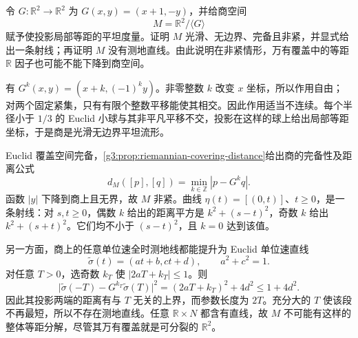 \begin{optionalexercise}\label{g3:ex:flat-mobius-no-line}
	令 \(G:\mathbb R^2\to\mathbb R^2\) 为 \(G(x,y)=(x+1,-y)\)，并给商空间
	\[
		M=\mathbb R^2/\langle G\rangle
	\]
	赋予使投影局部等距的平坦度量。证明 \(M\) 光滑、无边界、完备且非紧，并显式给出一条射线；再证明 \(M\) 没有测地直线。由此说明在非紧情形，万有覆盖中的等距 \(\mathbb R\) 因子也可能不能下降到商空间。
\end{optionalexercise}
\begin{solution}
	有 \(G^k(x,y)=(x+k,(-1)^ky)\)。非零整数 \(k\) 改变 \(x\) 坐标，所以作用自由；对两个固定紧集，只有有限个整数平移能使其相交。因此作用适当不连续。每个半径小于 \(1/3\) 的 Euclid 小球与其非平凡平移不交，投影在这样的球上给出局部等距坐标，于是商是光滑无边界平坦流形。

	Euclid 覆盖空间完备，\cref{g3:prop:riemannian-covering-distance}给出商的完备性及距离公式
	\[
		d_M([p],[q])=\min_{k\in\mathbb Z}|p-G^kq|.
	\]
	函数 \(|y|\) 下降到商上且无界，故 \(M\) 非紧。曲线 \(\eta(t)=[(0,t)]\)、\(t\ge0\)，是一条射线：对 \(s,t\ge0\)，偶数 \(k\) 给出的距离平方是 \(k^2+(s-t)^2\)，奇数 \(k\) 给出 \(k^2+(s+t)^2\)。它们均不小于 \((s-t)^2\)，且 \(k=0\) 达到该值。

	另一方面，商上的任意单位速全时测地线都能提升为 Euclid 单位速直线
	\[
		\widetilde\sigma(t)=(at+b,ct+d),\qquad a^2+c^2=1.
	\]
	对任意 \(T>0\)，选奇数 \(k_T\) 使 \(|2aT+k_T|\le1\)。则
	\[
		\bigl|\widetilde\sigma(-T)-G^{k_T}\widetilde\sigma(T)\bigr|^2
		=(2aT+k_T)^2+4d^2\le1+4d^2.
	\]
	因此其投影两端的距离有与 \(T\) 无关的上界，而参数长度为 \(2T\)。充分大的 \(T\) 使该段不再最短，所以不存在测地直线。任意 \(\mathbb R\times N\) 都含有直线，故 \(M\) 不可能有这样的整体等距分解，尽管其万有覆盖就是可分裂的 \(\mathbb R^2\)。
\end{solution}

